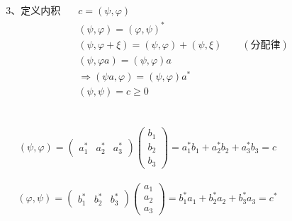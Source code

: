 \begin{frame} 
    \begin{equation*}
        \begin{split}
            \text{3、定义内积} \quad &c=(\psi, \varphi)\\
            &(\psi, \varphi)= (\varphi,\psi)^* \\
            &(\psi, \varphi+\xi)= (\psi, \varphi) + (\psi, \xi)\qquad (\text{分配律})\\
            &(\psi, \varphi a)= (\psi, \varphi )a \\
            &\Rightarrow (\psi a, \varphi )= (\psi, \varphi )a^* \\
            &(\psi,\psi)= c\ge 0\\
        \end{split}  
    \end{equation*}
\end{frame}

\begin{frame} 
    \解 ~ \[(\psi, \varphi) = \begin{pmatrix}
        a_1 ^* &
        a_2 ^* &
        a_3 ^*
    \end{pmatrix}
        \begin{pmatrix}
        b_1\\
        b_2\\
        b_3
    \end{pmatrix}
    =a_1 ^* b_1 +a_2 ^* b_2 +a_3 ^* b_3
    =c 
    \]
    ~ \[(\varphi,\psi) = \begin{pmatrix}
        b_1 ^* &
        b_2 ^* &
        b_3 ^*
    \end{pmatrix}
        \begin{pmatrix}
        a_1\\
        a_2\\
        a_3
    \end{pmatrix}
    =b_1 ^* a_1 +b_2 ^* a_2 +b_3 ^* a_3
    =c^* 
    \]
\end{frame} 


